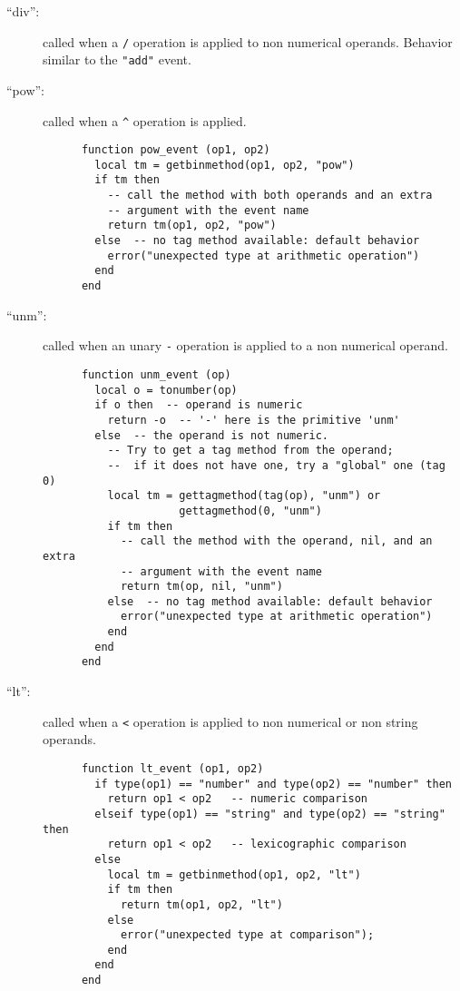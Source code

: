 \documentclass[11pt]{article}
\begin{document}
\begin{description}
\item[``div'':]
called when a \verb|/| operation is applied to non numerical operands.
Behavior similar to the \verb|"add"| event.

\item[``pow'':]
called when a \verb|^| operation is applied.
\begin{verbatim}
      function pow_event (op1, op2)
        local tm = getbinmethod(op1, op2, "pow")
        if tm then
          -- call the method with both operands and an extra
          -- argument with the event name
          return tm(op1, op2, "pow")
        else  -- no tag method available: default behavior
          error("unexpected type at arithmetic operation")
        end
      end
\end{verbatim}

\item[``unm'':]
called when an unary \verb|-| operation is applied to a non numerical operand.
\begin{verbatim}
      function unm_event (op)
        local o = tonumber(op)
        if o then  -- operand is numeric
          return -o  -- '-' here is the primitive 'unm'
        else  -- the operand is not numeric.
          -- Try to get a tag method from the operand;
          --  if it does not have one, try a "global" one (tag 0)
          local tm = gettagmethod(tag(op), "unm") or
                     gettagmethod(0, "unm")
          if tm then
            -- call the method with the operand, nil, and an extra
            -- argument with the event name
            return tm(op, nil, "unm")
          else  -- no tag method available: default behavior
            error("unexpected type at arithmetic operation")
          end
        end
      end
\end{verbatim}

\item[``lt'':]
called when a \verb|<| operation is applied to non numerical
or non string operands.
\begin{verbatim}
      function lt_event (op1, op2)
        if type(op1) == "number" and type(op2) == "number" then
          return op1 < op2   -- numeric comparison
        elseif type(op1) == "string" and type(op2) == "string" then
          return op1 < op2   -- lexicographic comparison
        else
          local tm = getbinmethod(op1, op2, "lt")
          if tm then
            return tm(op1, op2, "lt")
          else
            error("unexpected type at comparison");
          end
        end
      end
\end{verbatim}


\end{description}
\end{document}
